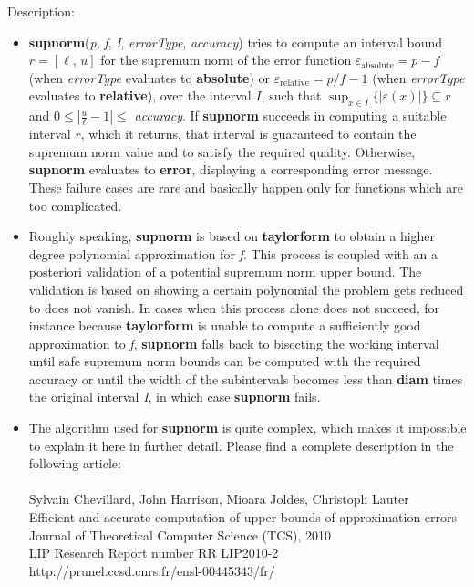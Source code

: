\noindent Description: \begin{itemize}

\item \textbf{supnorm}(\emph{p}, \emph{f}, \emph{I}, \emph{errorType}, \emph{accuracy}) tries to compute an interval
   bound $r = [\ell,\,u]$ for the supremum norm of the error function $\varepsilon_{\textrm{absolute}}=p-f$
   (when \emph{errorType} evaluates to \textbf{absolute}) or $\varepsilon_{\textrm{relative}}=p/f-1$ 
   (when \emph{errorType} evaluates to \textbf{relative}), over the interval $I$, 
   such that $\sup_{x \in I} \{|\varepsilon(x)|\}\subseteq r$ and $0 \le \left \vert\frac{u}{\ell} - 1 \right \vert \le$ \emph{accuracy}. 
   If \textbf{supnorm} succeeds in computing a suitable interval $r$, which it returns, 
   that interval is guaranteed to contain the supremum norm value and to satisfy the
   required quality. Otherwise, \textbf{supnorm} evaluates to \textbf{error}, displaying
   a corresponding error message. These failure cases are rare and
   basically happen only for functions which are too complicated.

\item Roughly speaking, \textbf{supnorm} is based on \textbf{taylorform} to obtain a higher
   degree polynomial approximation for \emph{f}. This process is coupled with
   an a posteriori validation of a potential supremum norm upper bound. 
   The validation is based on showing a certain polynomial the problem gets
   reduced to does not vanish. In cases when this process alone does not 
   succeed, for instance because \textbf{taylorform} is unable to compute a 
   sufficiently good approximation to \emph{f}, \textbf{supnorm} falls back to
   bisecting the working interval until safe supremum norm bounds can be
   computed with the required accuracy or until the width of the
   subintervals becomes less than \textbf{diam} times the original interval \emph{I}, 
   in which case \textbf{supnorm} fails.

\item The algorithm used for \textbf{supnorm} is quite complex, which makes it impossible 
   to explain it here in further detail. 
   Please find a complete description in the following article:\\
   ~\\
      Sylvain Chevillard, John Harrison, Mioara Joldes, Christoph Lauter\\
      Efficient and accurate computation of upper bounds of approximation errors\\
      Journal of Theoretical Computer Science (TCS), 2010\\
      LIP Research Report number RR LIP2010-2\\
      http://prunel.ccsd.cnrs.fr/ensl-00445343/fr/\\


\end{itemize}
